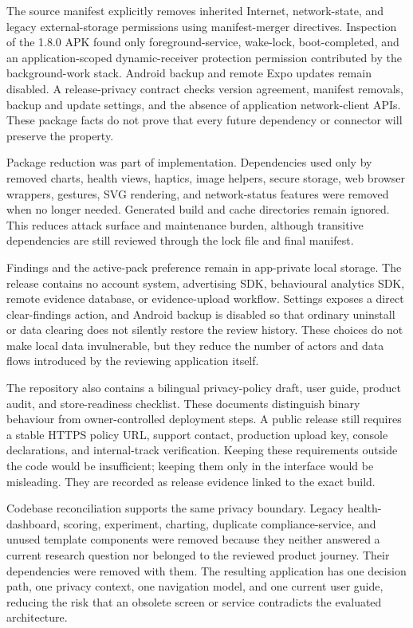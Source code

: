 The source manifest explicitly removes inherited Internet, network-state, and legacy external-storage permissions using manifest-merger directives. Inspection of the 1.8.0 APK found only foreground-service, wake-lock, boot-completed, and an application-scoped dynamic-receiver protection permission contributed by the background-work stack. Android backup and remote Expo updates remain disabled. A release-privacy contract checks version agreement, manifest removals, backup and update settings, and the absence of application network-client APIs. These package facts do not prove that every future dependency or connector will preserve the property.

Package reduction was part of implementation. Dependencies used only by removed charts, health views, haptics, image helpers, secure storage, web browser wrappers, gestures, SVG rendering, and network-status features were removed when no longer needed. Generated build and cache directories remain ignored. This reduces attack surface and maintenance burden, although transitive dependencies are still reviewed through the lock file and final manifest.

Findings and the active-pack preference remain in app-private local storage. The release contains no account system, advertising SDK, behavioural analytics SDK, remote evidence database, or evidence-upload workflow. Settings exposes a direct clear-findings action, and Android backup is disabled so that ordinary uninstall or data clearing does not silently restore the review history. These choices do not make local data invulnerable, but they reduce the number of actors and data flows introduced by the reviewing application itself.

The repository also contains a bilingual privacy-policy draft, user guide, product audit, and store-readiness checklist. These documents distinguish binary behaviour from owner-controlled deployment steps. A public release still requires a stable HTTPS policy URL, support contact, production upload key, console declarations, and internal-track verification. Keeping these requirements outside the code would be insufficient; keeping them only in the interface would be misleading. They are recorded as release evidence linked to the exact build.

Codebase reconciliation supports the same privacy boundary. Legacy health-dashboard, scoring, experiment, charting, duplicate compliance-service, and unused template components were removed because they neither answered a current research question nor belonged to the reviewed product journey. Their dependencies were removed with them. The resulting application has one decision path, one privacy context, one navigation model, and one current user guide, reducing the risk that an obsolete screen or service contradicts the evaluated architecture.

